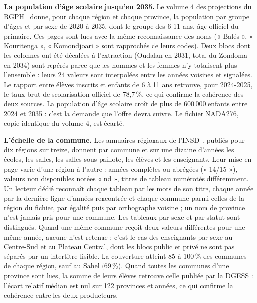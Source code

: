 \documentclass{article}
\begin{document}
\textbf{La population d'âge scolaire jusqu'en 2035.} Le volume 4 des projections du RGPH~\cite{insd_rgph} donne, pour chaque région et chaque province, la population par groupe d'âges et par sexe de 2020 à 2035, dont le groupe des 6-11 ans, âge officiel du primaire. Ces pages sont lues avec la même reconnaissance des noms (« Balés », « Kouritenga », « Komondjoari » sont rapprochés de leurs codes). Deux blocs dont les colonnes ont été décalées à l'extraction (Oudalan en 2031, total du Zondoma en 2034) sont repérés parce que les hommes et les femmes n'y totalisent plus l'ensemble : leurs 24 valeurs sont interpolées entre les années voisines et signalées. Le rapport entre élèves inscrits et enfants de 6 à 11 ans retrouve, pour 2024-2025, le taux brut de scolarisation officiel de 78,7\,\%, ce qui confirme la cohérence des deux sources. La population d'âge scolaire croît de plus de 600\,000 enfants entre 2024 et 2035 : c'est la demande que l'offre devra suivre. Le fichier NADA276, copie identique du volume 4, est écarté.

\textbf{L'échelle de la commune.} Les annuaires régionaux de l'INSD~\cite{insd_regionaux}, publiés pour dix régions sur treize, donnent par commune et sur une dizaine d'années les écoles, les salles, les salles sous paillote, les élèves et les enseignants. Leur mise en page varie d'une région à l'autre : années complètes ou abrégées (« 14/15 »), valeurs non disponibles notées « nd », titres de tableau numérotés différemment. Un lecteur dédié reconnaît chaque tableau par les mots de son titre, chaque année par la dernière ligne d'années rencontrée et chaque commune parmi celles de la région du fichier, par égalité puis par orthographe voisine ; un nom de province n'est jamais pris pour une commune. Les tableaux par sexe et par statut sont distingués. Quand une même commune reçoit deux valeurs différentes pour une même année, aucune n'est retenue : c'est le cas des enseignants par sexe au Centre-Sud et au Plateau Central, dont les blocs public et privé ne sont pas séparés par un intertitre lisible. La couverture atteint 85 à 100\,\% des communes de chaque région, sauf au Sahel (69\,\%). Quand toutes les communes d'une province sont lues, la somme de leurs élèves retrouve celle publiée par la DGESS : l'écart relatif médian est nul sur 122 provinces et années, ce qui confirme la cohérence entre les deux producteurs.
\end{document}

